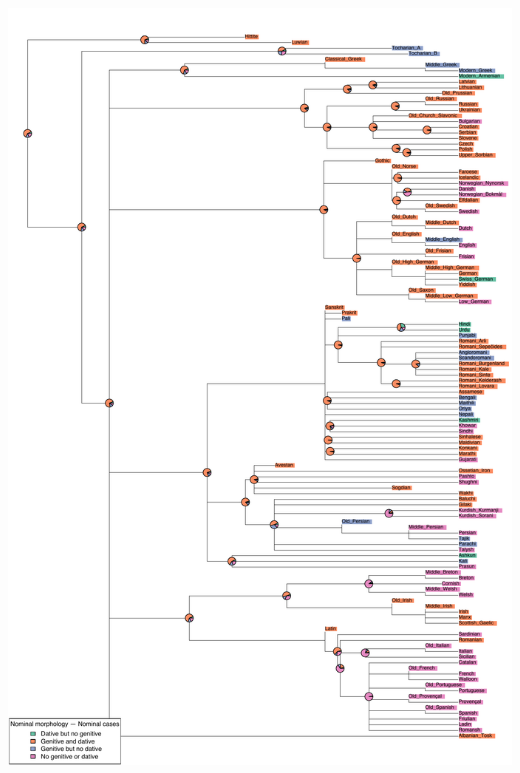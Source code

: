 \includegraphics[width=.9\linewidth]{supp-graphics/NominalmorphologyNominalcasesDATNominalmorphologyNominalcasesGENNominalmorphologyNominalcasesGENDAT.pdf}

